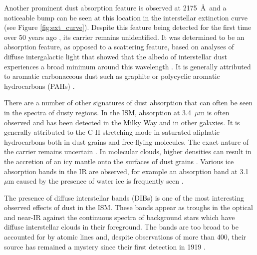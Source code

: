 Another prominent dust absorption feature  is observed at 2175~\AA\ and a noticeable bump can be seen at this location in the interstellar extinction curve (see Figure \ref{fig:ext_curve}).  Despite this feature being detected for the first time over 50 years ago \citep{Stecher1965}, its carrier remains unidentified.  It was determined to be an absorption feature, as opposed to a scattering feature, based on analyses of diffuse intergalactic light that showed that the albedo of interstellar dust experiences a broad minimum around this wavelength \citep{Lillie1976,Witt1982,Witt1986}.  It is generally attributed to aromatic carbonaceous dust such as graphite \citep{Stecher1965a} or polycyclic aromatic hydrocarbons (PAHs) \citep{Joblin1992,Li2001}.

There are a number of other signatures of dust absorption that can often be seen in  the spectra of dusty regions.  In the ISM, absorption at 3.4~$\mu$m is often observed and has been detected in the Milky Way and in other galaxies.  It is generally attributed to the C-H stretching mode in saturated aliphatic hydrocarbons both in dust grains and free-flying molecules.  The exact nature of the carrier remains uncertain \citep{Pendleton2002}. In molecular clouds, higher densities can result in the accretion of an icy mantle onto the surfaces of dust grains \citep{Schutte1997}.  Various ice absorption bands in the IR are observed, for example an absorption band at 3.1~$\mu$m caused by the presence of water ice is frequently seen \citep{Ehrenfreund2000}.

The presence of diffuse interstellar bands (DIBs) is one of the most interesting observed effects of dust in the ISM.  These bands appear as troughs in the optical and near-IR against the continuous spectra of background stars which have diffuse interstellar clouds in their foreground.  The bands are too broad to be accounted for by atomic lines and, despite observations of more than 400, their source has remained a mystery since their first detection in 1919 \citep{Heger1922,Hobbs2008,Hobbs2009}.



